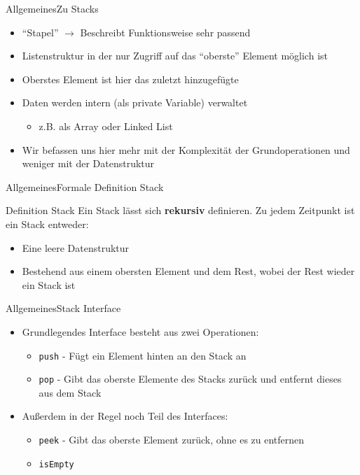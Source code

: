 \begin{frame}{Allgemeines}{Zu Stacks}
	\begin{itemize}
		\item "`Stapel"' $\rightarrow$ Beschreibt Funktionsweise sehr passend
		\item Listenstruktur in der nur Zugriff auf das "`oberste"' Element möglich ist
		\item Oberstes Element ist hier das zuletzt hinzugefügte
		\item Daten werden intern (als private Variable) verwaltet
		\begin{itemize}
			\item z.B. als Array oder Linked List
		\end{itemize}
		\item Wir befassen uns hier mehr mit der Komplexität der Grundoperationen und weniger mit der Datenstruktur
	\end{itemize}
\end{frame}

\begin{frame}{Allgemeines}{Formale Definition Stack}
	\begin{alertblock}{Definition Stack}
	Ein Stack lässt sich \textbf{rekursiv} definieren. Zu jedem Zeitpunkt ist ein Stack entweder:
	\begin{itemize}
		\item Eine leere Datenstruktur
		\item Bestehend aus einem obersten Element und dem Rest, wobei der Rest wieder ein Stack ist
	\end{itemize}
	\end{alertblock}
\end{frame}

\begin{frame}{Allgemeines}{Stack Interface}
	\begin{itemize}
		\item Grundlegendes Interface besteht aus zwei Operationen:
		\begin{itemize}
			\item \texttt{push} - Fügt ein Element hinten an den Stack an
			\item \texttt{pop} - Gibt das oberste Elemente des Stacks zurück und entfernt dieses aus dem Stack
		\end{itemize}
		\item Außerdem in der Regel noch Teil des Interfaces:
		\begin{itemize}
			\item \texttt{peek} - Gibt das oberste Element zurück, ohne es zu entfernen
			\item \texttt{isEmpty}
		\end{itemize}
	\end{itemize}
\end{frame}

